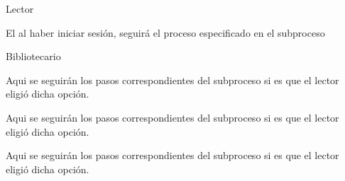 \begin{PDescripcion}

  \Ppaso Lector

    \begin{enumerate}

\Ppaso[\itarea]  El  al haber iniciar sesión, seguirá el proceso especificado en el subproceso 

	

    \end{enumerate}
    
    
  \Ppaso Bibliotecario 

    \begin{enumerate}

      \Ppaso[\itarea]  Aqui se seguirán los pasos correspondientes del subproceso  si es que el lector eligió dicha opción.



      \Ppaso[\itarea]  Aqui se seguirán los pasos correspondientes del subproceso  si es que el lector eligió dicha opción.
      
      \Ppaso[\itarea]  Aqui se seguirán los pasos correspondientes del subproceso  si es que el lector eligió dicha opción.     

          \end{enumerate}

\end{PDescripcion}


